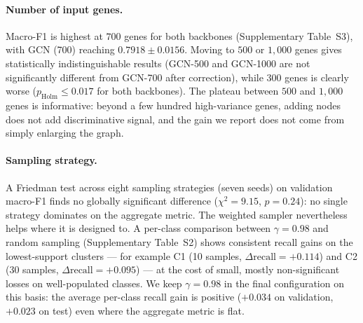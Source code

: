 \documentclass[review,3p,times,11pt, ]{elsarticle} %
\begin{document}
\paragraph{Number of input genes.}
Macro-F1 is highest at $700$ genes for both backbones
(Supplementary Table~S3), with GCN (700) reaching
$0.7918 \pm 0.0156$. Moving to $500$ or $1{,}000$ genes gives
statistically indistinguishable results (GCN-500 and GCN-1000 are not
significantly different from GCN-700 after correction), while $300$
genes is clearly worse ($p_{\text{Holm}} \leq 0.017$ for both
backbones). The plateau between $500$ and $1{,}000$ genes is
informative: beyond a few hundred high-variance genes, adding nodes
does not add discriminative signal, and the gain we report does not
come from simply enlarging the graph.

\paragraph{Sampling strategy.}
A Friedman test across eight sampling strategies (seven seeds) on
validation macro-F1 finds no globally significant difference
($\chi^2 = 9.15$, $p = 0.24$): no single strategy dominates on the
aggregate metric. The weighted sampler nevertheless helps where it is
designed to. A per-class comparison between $\gamma = 0.98$ and random
sampling (Supplementary Table~S2) shows consistent recall gains on the
lowest-support clusters — for example C1 (10 samples,
$\Delta\text{recall} = +0.114$) and C2 (30 samples,
$\Delta\text{recall} = +0.095$) — at the cost of small, mostly
non-significant losses on well-populated classes. We keep
$\gamma = 0.98$ in the final configuration on this basis: the average
per-class recall gain is positive ($+0.034$ on validation, $+0.023$ on
test) even where the aggregate metric is flat.
\end{document}
